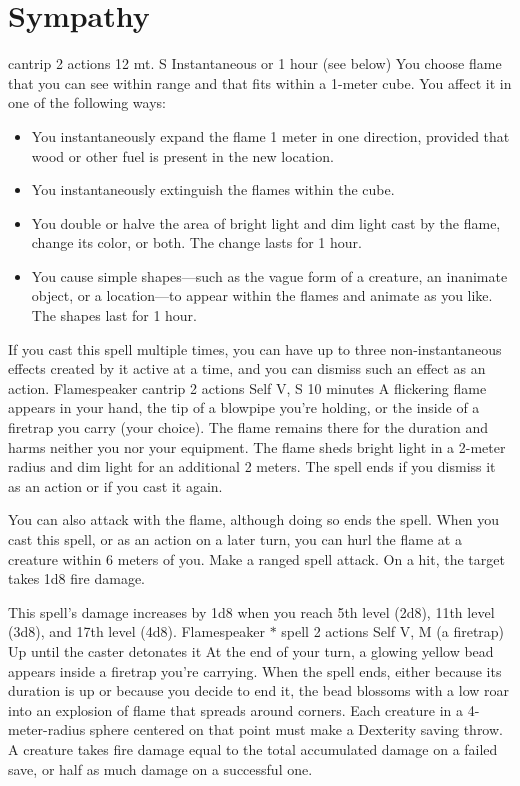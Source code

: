 \section{Sympathy}

    {cantrip}
    {2 actions}
    {12 mt.}
    {S}
    {Instantaneous or 1 hour (see below)}
    You choose flame that you can see within range and that fits within a 1-meter cube.
    You affect it in one of the following ways:
    \begin{itemize}
        \item You instantaneously expand the flame 1 meter in one direction, provided that wood or other fuel is present in the new location.
        \item You instantaneously extinguish the flames within the cube.
        \item You double or halve the area of bright light and dim light cast by the flame, change its color, or both.
        The change lasts for 1 hour.
        \item You cause simple shapes---such as the vague form of a creature, an inanimate object, or a location---to appear within the flames and animate as you like.
        The shapes last for 1 hour.
    \end{itemize}
    If you cast this spell multiple times, you can have up to three non-instantaneous effects created by it active at a time, and you can dismiss such an effect as an action.
    {Flamespeaker cantrip}
    {2 actions}
    {Self}
    {V, S}
    {10 minutes}
    A flickering flame appears in your hand, the tip of a blowpipe you're holding, or the inside of a firetrap you carry (your choice).
    The flame remains there for the duration and harms neither you nor your equipment.
    The flame sheds bright light in a 2-meter radius and dim light for an additional 2 meters.
    The spell ends if you dismiss it as an action or if you cast it again.

    You can also attack with the flame, although doing so ends the spell.
    When you cast this spell, or as an action on a later turn, you can hurl the flame at a creature within 6 meters of you.
    Make a ranged spell attack.
    On a hit, the target takes 1d8 fire damage.

    This spell's damage increases by 1d8 when you reach 5th level (2d8), 11th level (3d8), and 17th level (4d8).
    {Flamespeaker $\ast$ spell}
    {2 actions}
    {Self}
    {V, M (a firetrap)}
    {Up until the caster detonates it}
    At the end of your turn, a glowing yellow bead appears inside a firetrap you're carrying.
    When the spell ends, either because its duration is up or because you decide to end it, the bead blossoms with a low roar into an explosion of flame that spreads around corners.
    Each creature in a 4-meter-radius sphere centered on that point must make a Dexterity saving throw.
    A creature takes fire damage equal to the total accumulated damage on a failed save, or half as much damage on a successful one.

